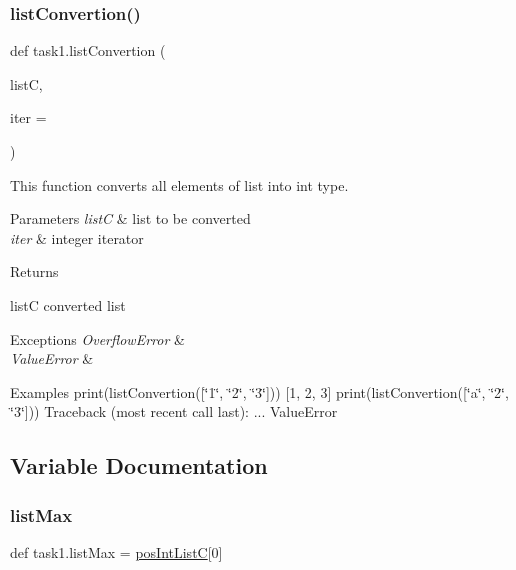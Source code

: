 \subsubsection{\texorpdfstring{list\+Convertion()}{listConvertion()}}
{\footnotesize\ttfamily def task1.\+list\+Convertion (\begin{DoxyParamCaption}\item[{}]{listC,  }\item[{}]{iter = {} }\end{DoxyParamCaption})}



This function converts all elements of list into int type. 


\begin{DoxyParams}{Parameters}
{\em listC} & list to be converted \\
\hline
{\em iter} & integer iterator \\
\hline
\end{DoxyParams}
\begin{DoxyReturn}{Returns}


listC converted list
\end{DoxyReturn}

\begin{DoxyExceptions}{Exceptions}
{\em Overflow\+Error} & \\
\hline
{\em Value\+Error} & \\
\hline
\end{DoxyExceptions}
\begin{DoxyParagraph}{Examples}
print(list\+Convertion(\mbox{[}\char`\"{}1\char`\"{}, \char`\"{}2\char`\"{}, \char`\"{}3\char`\"{}\mbox{]})) \mbox{[}1, 2, 3\mbox{]} print(list\+Convertion(\mbox{[}\char`\"{}a\char`\"{}, \char`\"{}2\char`\"{}, \char`\"{}3\char`\"{}\mbox{]})) Traceback (most recent call last)\+: ... Value\+Error 
\end{DoxyParagraph}


\subsection{Variable Documentation}
\mbox{\label{namespacetask1_a228980e4354a16d91583cc8b23e2405c}} 
\subsubsection{\texorpdfstring{list\+Max}{listMax}}
{\footnotesize\ttfamily def task1.\+list\+Max = \hyperlink{namespacetask1_a6cabdd323ac8029987571a816c6f89a4}{pos\+Int\+ListC}\mbox{[}0\mbox{]}}


